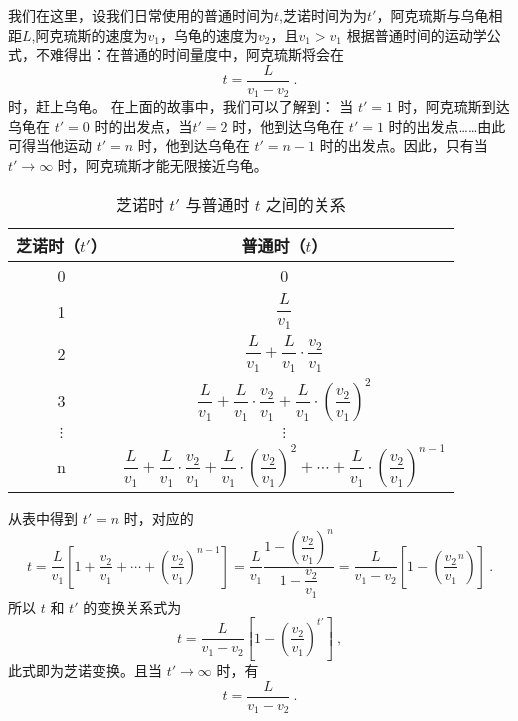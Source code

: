 我们在这里，设我们日常使用的普通时间为$t$,芝诺时间为为$t'$，阿克琉斯与乌龟相距$L$,阿克琉斯的速度为$v_1$，乌龟的速度为$v_2$，且$v_1>v_1$
根据普通时间的运动学公式，不难得出：在普通的时间量度中，阿克琉斯将会在
\begin{equation}
t = \dfrac{L}{v_1 - v_2}~.
\end{equation}
时，赶上乌龟。
在上面的故事中，我们可以了解到：
当 $t'=1$ 时，阿克琉斯到达乌龟在 $t'=0$ 时的出发点，当$t'=2$ 时，他到达乌龟在 $t'=1$ 时的出发点……由此可得当他运动 $t'=n$ 时，他到达乌龟在 $t'=n-1$ 时的出发点。因此，只有当 $t'\to\infty$ 时，阿克琉斯才能无限接近乌龟。\begin{table}[ht]
\centering
\caption{芝诺时 $t'$ 与普通时 $t$ 之间的关系}\label{tab_zeno_1}
\begin{tabular}{|c|c|}
\hline
芝诺时（$t'$） & 普通时（$t$） \\
\hline
0 & 0 \\
\hline
1 & $\dfrac{L}{v_1}$ \\
\hline
2 & $\dfrac{L}{v_1}+\dfrac{L}{v_1}\cdot\dfrac{v_2}{v_1}$ \\
\hline
3 & $\dfrac{L}{v_1}+\dfrac{L}{v_1}\cdot\dfrac{v_2}{v_1}+\dfrac{L}{v_1}\cdot(\dfrac{v_2}{v_1})^2$ \\
\hline
$\vdots$ & $\vdots$ \\
\hline
n & $\dfrac{L}{v_1}+\dfrac{L}{v_1}\cdot\dfrac{v_2}{v_1}+\dfrac{L}{v_1}\cdot(\dfrac{v_2}{v_1})^2+\cdots+\dfrac{L}{v_1}\cdot(\dfrac{v_2}{v_1})^{n-1}$ \\
\hline
\end{tabular}
\end{table}
从表中得到 $t'=n$ 时，对应的
\begin{equation}
t=\dfrac{L}{v_1}[1+\dfrac{v_2}{v_1}+\cdots+(\dfrac{v_2}{v_1})^{n-1}]=\dfrac{L}{v_1}\dfrac{1-(\dfrac{v_2}{v_1})^n}{1-\dfrac{v_2}{v_1}}=\dfrac{L}{v_1-v_2}[1-(\dfrac{v_2}{v_1}^n)]~.
\end{equation}
所以 $t$ 和 $t'$ 的变换关系式为
\begin{equation}
t=\dfrac{L}{v_1-v_2}[1-(\dfrac{v_2}{v_1})^{t'}]~,
\end{equation}
此式即为芝诺变换。且当 $t'\to\infty$ 时，有
\begin{equation}
t=\dfrac{L}{v_1-v_2}~.
\end{equation}